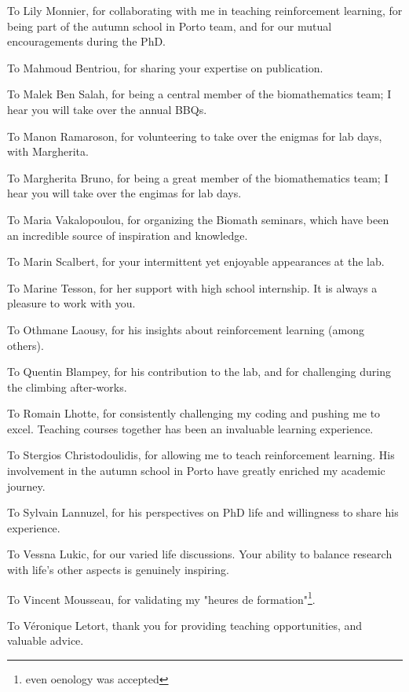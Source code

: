 To Lily Monnier, for collaborating with me in teaching reinforcement learning, for being part of the autumn school in Porto team, and for our mutual encouragements during the PhD.

To Mahmoud Bentriou, for sharing your expertise on publication.

To Malek Ben Salah, for being a central member of the biomathematics team; I hear you will take over the annual BBQs.

To Manon Ramaroson, for volunteering to take over the enigmas for lab days, with Margherita.

To Margherita Bruno, for being a great member of the biomathematics team; I hear you will take over the engimas for lab days.

To Maria Vakalopoulou, for organizing the Biomath seminars, which have been an incredible source of inspiration and knowledge.

To Marin Scalbert, for your intermittent yet enjoyable appearances at the lab.

To Marine Tesson, for her support with high school internship.
It is always a pleasure to work with you.


To Othmane Laousy, for his insights about reinforcement learning (among others).

To Quentin Blampey, for his contribution to the lab, and for challenging during the climbing after-works.

To Romain Lhotte, for consistently challenging my coding and pushing me to excel.
Teaching courses together has been an invaluable learning experience.

To Stergios Christodoulidis, for allowing me to teach reinforcement learning.
His involvement in the autumn school in Porto have greatly enriched my academic journey.

To Sylvain Lannuzel, for his perspectives on PhD life and willingness to share his experience.

To Vessna Lukic, for our varied life discussions.
Your ability to balance research with life's other aspects is genuinely inspiring.

To Vincent Mousseau, for validating my "heures de formation"\footnote{even oenology was accepted}.

To Véronique Letort, thank you for providing teaching opportunities, and valuable advice.

